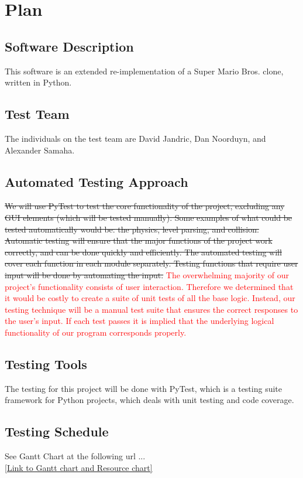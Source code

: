 \documentclass[12pt, titlepage]{article}
\begin{document}
\section{Plan}

\subsection{Software Description}
This software is an extended re-implementation of a Super Mario Bros. clone,
written in Python.


\subsection{Test Team}
The individuals on the test team are David Jandric, Dan Noorduyn, and Alexander Samaha.



\subsection{Automated Testing Approach}
\sout{We will use PyTest to test the core functionality of the project, excluding any
GUI elements (which will be tested manually). Some examples of what could be
tested automatically would be: the physics, level parsing, and collision.
Automatic testing will ensure that the major functions of the project work
correctly, and can be done quickly and efficiently. The automated testing
will cover each function in each module separately. Testing functions that require
user input will be done by automating the input.} \textcolor{red}{The overwhelming majority of our project's functionality consists of user interaction. Therefore we determined that it would be costly to create a suite of unit tests of all the base logic. Instead, our testing technique will be a manual test suite that ensures the correct responses to the user's input. If each test passes it is implied that the underlying logical functionality of our program corresponds properly.}



\subsection{Testing Tools}
The testing for this project will be done with PyTest, which is a testing suite framework for
Python projects, which deals with unit testing and code coverage.



\subsection{Testing Schedule}
See Gantt Chart at the following url ...\\
\href{https://gitlab.cas.mcmaster.ca/jandricd/super-refactored-mario-bros/tree/master/ProjectSchedule}{[Link to Gantt chart and Resource chart]}
\end{document}
